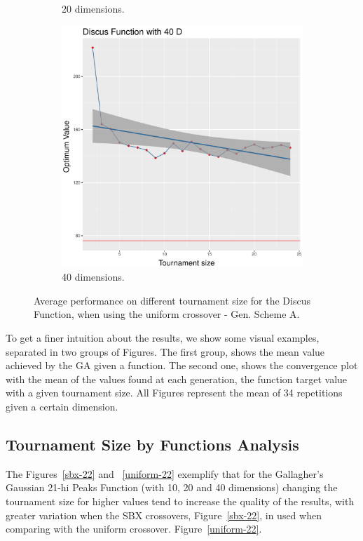 \begin{figure}[t]
\begin{subfigure}[b]{0.33\textwidth}
		\caption{20 dimensions.}
	\end{subfigure}
	\begin{subfigure}[b]{0.33\textwidth}
		\centering
		\includegraphics[width=\textwidth]{img/unimodal_uniform_11_dim_40.pdf}
		\caption{40 dimensions.}
	\end{subfigure}
	\caption{Average performance on different tournament size for the Discus Function, when using the uniform crossover - Gen. Scheme A.}
	\label{uniform-11}
\end{figure}


To get a finer intuition about the results, we show  some visual examples, separated in two groups of Figures. The first group, shows the mean value achieved by the GA given a function. The second one, shows the convergence plot with the mean of the values found at each generation, the function target value with a given tournament size. All Figures represent the mean of 34 repetitions given a certain dimension.



\subsection{Tournament Size by Functions Analysis}
The Figures~\ref{sbx-22} and ~\ref{uniform-22} exemplify that for the Gallagher's Gaussian 21-hi Peaks Function (with 10, 20 and 40 dimensions) changing the tournament size for higher values tend to increase the quality of the results, with greater variation when the SBX crossovers, Figure~\ref{sbx-22}, in used when comparing with the uniform crossover. Figure~\ref{uniform-22}.

